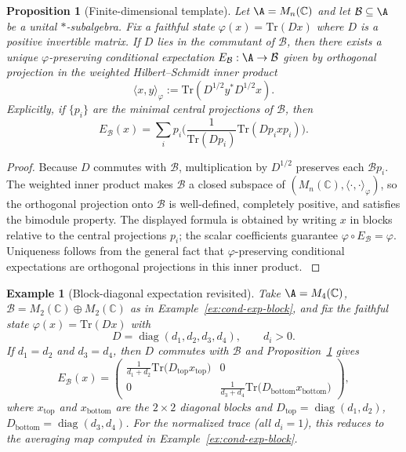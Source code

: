 \documentclass[11pt, a4paper]{article}
\theoremstyle{colored_def}
\theoremstyle{colored_thm}
\newtheorem{proposition}[theorem]{Proposition}
\theoremstyle{colored_ex}
\newtheorem{example}{Example}[section]
\newcommand{\C}{\mathbb{C}}
\newcommand{\Tr}{\text{Tr}}
\newcommand{\B}{\mathcal{B}}
\begin{document}
\begin{proposition}[Finite-dimensional template]\label{prop:finite-dim-conditional-expectation}
Let $\A = M_n(\C)$ and let $\B \subseteq \A$ be a unital $*$-subalgebra. Fix a faithful state $\varphi(x) = \Tr(Dx)$ where $D$ is a positive invertible matrix. If $D$ lies in the commutant of $\B$, then there exists a unique $\varphi$-preserving conditional expectation $E_{\B}: \A \to \B$ given by orthogonal projection in the weighted Hilbert--Schmidt inner product
$$
\langle x, y \rangle_{\varphi} := \Tr(D^{1/2} y^* D^{1/2} x).
$$
Explicitly, if $\{p_i\}$ are the minimal central projections of $\B$, then
$$
E_{\B}(x) = \sum_i p_i \Big( \frac{1}{\Tr(D p_i)} \Tr(D p_i x p_i) \Big).
$$
\end{proposition}

\begin{proof}
Because $D$ commutes with $\B$, multiplication by $D^{1/2}$ preserves each $\B p_i$. The weighted inner product makes $\B$ a closed subspace of $(M_n(\C), \langle \cdot, \cdot \rangle_{\varphi})$, so the orthogonal projection onto $\B$ is well-defined, completely positive, and satisfies the bimodule property. The displayed formula is obtained by writing $x$ in blocks relative to the central projections $p_i$; the scalar coefficients guarantee $\varphi \circ E_{\B} = \varphi$. Uniqueness follows from the general fact that $\varphi$-preserving conditional expectations are orthogonal projections in this inner product. \cite{sakai1971cstarwstar}
\end{proof}

\begin{example}[Block-diagonal expectation revisited]\label{ex:block-revisited}
Take $\A = M_4(\C)$, $\B = M_2(\C) \oplus M_2(\C)$ as in Example~\ref{ex:cond-exp-block}, and fix the faithful state $\varphi(x) = \Tr(Dx)$ with
$$
D = \operatorname{diag}(d_1, d_2, d_3, d_4), \qquad d_i > 0.
$$
If $d_1 = d_2$ and $d_3 = d_4$, then $D$ commutes with $\B$ and Proposition~\ref{prop:finite-dim-conditional-expectation} gives
$$
E_{\B}(x) = \begin{pmatrix}
\frac{1}{d_1 + d_2}\Tr\big(D_{\text{top}} x_{\text{top}}\big) & 0 \\
0 & \frac{1}{d_3 + d_4}\Tr\big(D_{\text{bottom}} x_{\text{bottom}}\big)
\end{pmatrix},
$$
where $x_{\text{top}}$ and $x_{\text{bottom}}$ are the $2 \times 2$ diagonal blocks and $D_{\text{top}} = \operatorname{diag}(d_1, d_2)$, $D_{\text{bottom}} = \operatorname{diag}(d_3, d_4)$. For the normalized trace (all $d_i = 1$), this reduces to the averaging map computed in Example~\ref{ex:cond-exp-block}.
\end{example}
\end{document}
